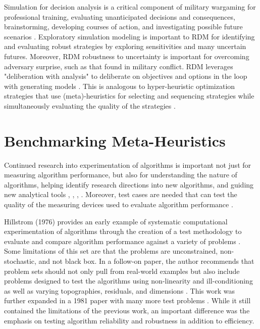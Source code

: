 \documentclass[a4paper]{article}
\begin{document}
Simulation for decision analysis is a critical component of military wargaming for professional training, evaluating unanticipated decisions and consequences, brainstorming, developing courses of action, and investigating possible future scenarios \cite{oren_body_2023}. Exploratory simulation modeling is important to RDM for identifying and evaluating robust strategies by exploring sensitivities and many uncertain futures. Moreover, RDM robustness to uncertainty is important for overcoming adversary surprise, such as that found in military conflict. RDM leverages "deliberation with analysis" to deliberate on objectives and options in the loop with generating models \cite{marchau_decision_2019}. This is analogous to hyper-heuristic optimization strategies that use (meta)-heuristics for selecting and sequencing strategies while simultaneously evaluating the quality of the strategies \cite{dokeroglu_hyper-heuristics_2024}.


\section{Benchmarking Meta-Heuristics}

Continued research into experimentation of algorithms is important not just for measuring algorithm performance, but also for understanding the nature of algorithms, helping identify research directions into new algorithms, and guiding new analytical tools \cite{mcgeoch_experimental_2001}, \cite{beiranvand_best_2017}, \cite{di_fiore_active_2024}, \cite{tedford_benchmarking_2010}. Moreover, test cases are needed that can test the quality of the measuring devices used to evaluate algorithm performance \cite{lizarraga_set_2008}. 

Hillstrom (1976) provides an early example of systematic computational experimentation of algorithms through the creation of a test methodology to evaluate and compare algorithm performance against a variety of problems \cite{hillstrom_simulation_1976}. Some limitations of this set are that the problems are unconstrained, non-stochastic, and not black box. In a follow-on paper, the author recommends that problem sets should not only pull from real-world examples but also include problems designed to test the algorithms using non-linearity and ill-conditioning as well as varying topographies, residuals, and dimensions \cite{hillstrom_simulation_1977}. This work was further expanded in a 1981 paper with many more test problems \cite{more_testing_1981}. While it still contained the limitations of the previous work, an important difference was the emphasis on testing algorithm reliability and robustness in addition to efficiency.
\end{document}
